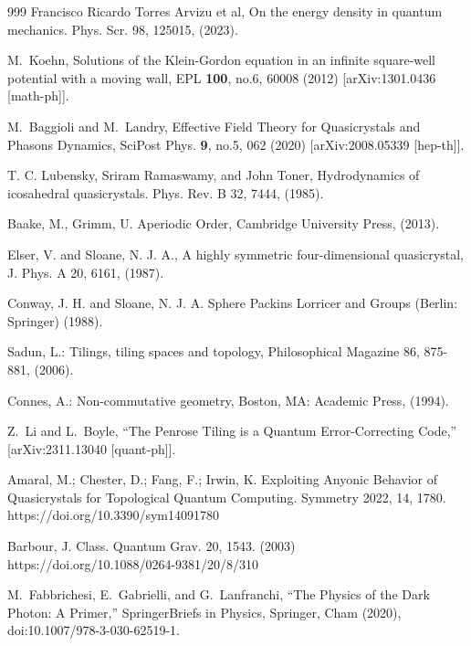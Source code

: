 \documentclass{article}
\begin{document}
\begin{thebibliography}{999}
    Francisco Ricardo Torres Arvizu et al, On the energy density in quantum mechanics. Phys. Scr. 98, 125015, (2023).

    M.~Koehn,
    Solutions of the Klein-Gordon equation in an infinite square-well potential with a moving wall,
    EPL \textbf{100}, no.6, 60008 (2012)
    [arXiv:1301.0436 [math-ph]].

    M.~Baggioli and M.~Landry,
    Effective Field Theory for Quasicrystals and Phasons Dynamics,
    SciPost Phys. \textbf{9}, no.5, 062 (2020)
    [arXiv:2008.05339 [hep-th]].

    T. C. Lubensky, Sriram Ramaswamy, and John Toner, Hydrodynamics of icosahedral quasicrystals. Phys. Rev. B 32, 7444, (1985).

 	Baake, M., Grimm, U. Aperiodic Order, Cambridge University Press, (2013).

    Elser, V. and Sloane, N. J. A., A highly symmetric four-dimensional quasicrystal, J. Phys. A 20, 6161, (1987).

     Conway, J. H. and Sloane, N. J. A. Sphere Packins Lorricer and Groups (Berlin: Springer) (1988).

	Sadun, L.: Tilings, tiling spaces and topology, Philosophical Magazine 86, 875-881, (2006). 

  Connes, A.: Non-commutative geometry, Boston, MA: Academic Press, (1994).

    Z.~Li and L.~Boyle,
    ``The Penrose Tiling is a Quantum Error-Correcting Code,''
    [arXiv:2311.13040 [quant-ph]].
    
    Amaral, M.; Chester, D.; Fang, F.; Irwin, K. Exploiting Anyonic Behavior of Quasicrystals for Topological Quantum Computing. Symmetry 2022, 14, 1780. https://doi.org/10.3390/sym14091780
    
    Barbour, J. Class. Quantum Grav. 20, 1543. (2003)
    https://doi.org/10.1088/0264-9381/20/8/310
    
    M.~Fabbrichesi, E.~Gabrielli, and G.~Lanfranchi,
    ``The Physics of the Dark Photon: A Primer,''
    SpringerBriefs in Physics, Springer, Cham (2020),
    doi:10.1007/978-3-030-62519-1.



\end{thebibliography}
\end{document}
